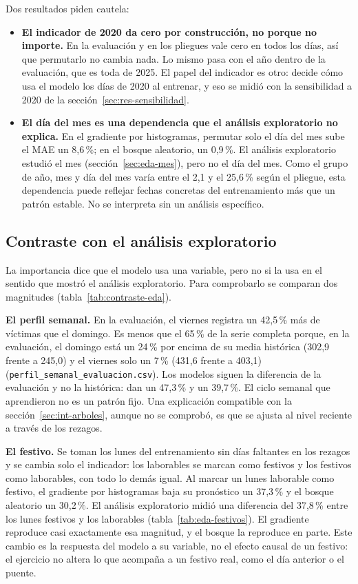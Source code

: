 Dos resultados piden cautela:
\begin{itemize}
\item \textbf{El indicador de 2020 da cero por construcción, no porque no importe.} En la evaluación y en los pliegues vale cero en todos los días, así que permutarlo no cambia nada. Lo mismo pasa con el año dentro de la evaluación, que es toda de 2025. El papel del indicador es otro: decide cómo usa el modelo los días de 2020 al entrenar, y eso se midió con la sensibilidad a 2020 de la sección~\ref{sec:res-sensibilidad}.
\item \textbf{El día del mes es una dependencia que el análisis exploratorio no explica.} En el gradiente por histogramas, permutar solo el día del mes sube el MAE un 8,6\,\%; en el bosque aleatorio, un 0,9\,\%. El análisis exploratorio estudió el mes (sección~\ref{sec:eda-mes}), pero no el día del mes. Como el grupo de año, mes y día del mes varía entre el 2,1 y el 25,6\,\% según el pliegue, esta dependencia puede reflejar fechas concretas del entrenamiento más que un patrón estable. No se interpreta sin un análisis específico.
\end{itemize}

\subsection{Contraste con el análisis exploratorio}\label{sec:int-eda}

La importancia dice que el modelo usa una variable, pero no si la usa en el sentido que mostró el análisis exploratorio. Para comprobarlo se comparan dos magnitudes (tabla~\ref{tab:contraste-eda}).

\textbf{El perfil semanal.} En la evaluación, el viernes registra un 42,5\,\% más de víctimas que el domingo. Es menos que el 65\,\% de la serie completa porque, en la evaluación, el domingo está un 24\,\% por encima de su media histórica (302,9 frente a 245,0) y el viernes solo un 7\,\% (431,6 frente a 403,1) (\texttt{perfil\_\allowbreak{}semanal\_\allowbreak{}evaluacion.csv}). Los modelos siguen la diferencia de la evaluación y no la histórica: dan un 47,3\,\% y un 39,7\,\%. El ciclo semanal que aprendieron no es un patrón fijo. Una explicación compatible con la sección~\ref{sec:int-arboles}, aunque no se comprobó, es que se ajusta al nivel reciente a través de los rezagos.

\textbf{El festivo.} Se toman los lunes del entrenamiento sin días faltantes en los rezagos y se cambia solo el indicador: los laborables se marcan como festivos y los festivos como laborables, con todo lo demás igual. Al marcar un lunes laborable como festivo, el gradiente por histogramas baja su pronóstico un 37,3\,\% y el bosque aleatorio un 30,2\,\%. El análisis exploratorio midió una diferencia del 37,8\,\% entre los lunes festivos y los laborables (tabla~\ref{tab:eda-festivos}). El gradiente reproduce casi exactamente esa magnitud, y el bosque la reproduce en parte. Este cambio es la respuesta del modelo a su variable, no el efecto causal de un festivo: el ejercicio no altera lo que acompaña a un festivo real, como el día anterior o el puente.

